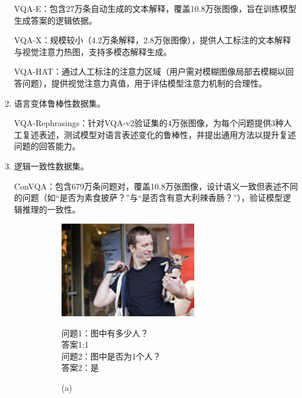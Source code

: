 \begin{enumerate}[itemsep=0pt,parsep=0pt]
​VQA-E\cite{li2018vqa}：包含27万条自动生成的文本解释，覆盖10.8万张图像，旨在训练模型生成答案的逻辑依据。

​VQA-X\cite{park2018multimodal}：规模较小（4.2万条解释，2.8万张图像），提供人工标注的文本解释与视觉注意力热图，支持多模态解释生成。

​VQA-HAT\cite{das2017human}：通过人工标注的注意力区域（用户需对模糊图像局部去模糊以回答问题），提供视觉注意力真值，用于评估模型注意力机制的合理性。
    \item 语言变体鲁棒性数据集。

​VQA-Rephrasings\cite{shah2019cycle}：针对VQA-v2验证集的4万张图像，为每个问题提供3种人工复述表述，测试模型对语言表述变化的鲁棒性，并提出通用方法以提升复述问题的回答能力。
    \item 逻辑一致性数据集。

​ConVQA\cite{ray2018make}：包含679万条问题对，覆盖10.8万张图像，设计语义一致但表述不同的问题（如“是否为素食披萨？”与“是否含有意大利辣香肠？”），验证模型逻辑推理的一致性。
\begin{figure}[h]
    \begin{subfigure}[b]{0.45\textwidth}
        \centering
        \includegraphics[width=0.7\textwidth, keepaspectratio]{figures/CONVQA-A.png}
        \begin{center}
            \footnotesize 问题1：图中有多少人？\\
            \footnotesize 答案1:1\\
            \footnotesize 问题2：图中是否为1个人？\\
            \footnotesize 答案2：是\\
        \end{center}
        \caption*{(a)}
    \end{subfigure}
    \hfill
    \begin{subfigure}[b]{0.45\textwidth}
        \centering

\end{subfigure}
\end{figure}
\end{enumerate}
